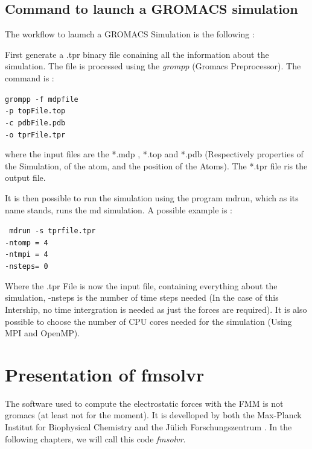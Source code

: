 \documentclass[12pt,twoside,a4paper]{report}
\begin{document}
	\subsection{Command to launch a GROMACS simulation }	
	
The workflow to laumch a GROMACS Simulation is the following : 



First generate a .tpr binary file conaining all the information about the simulation. The file is processed using the \textit{grompp} (Gromacs Preprocessor). The command is :


{\centering\tt {grompp -f mdpfile \\
	 -p topFile.top \\
	 -c pdbFile.pdb \\
	 -o tprFile.tpr \\ 
 }}

\vspace{5mm}
where the input files are the *.mdp , *.top and *.pdb (Respectively properties of the Simulation, of the atom, and the position of the Atoms). The *.tpr file ris the output file.

It is then possible to run the simulation using the program mdrun, which as its name stands, runs the md simulation. A possible example is :

{\centering\tt { mdrun -s tprfile.tpr \\
				 -ntomp = 4  			\\		
				 -ntmpi = 4				 \\
				 -nsteps= 0     		  \\  
 }}
 
\vspace{5mm}

Where the .tpr File is now the input file, containing everything about the simulation, -nsteps is the number of time steps needed (In the case of this Intership, no time intergration is needed as just the forces are required). It is also possible to choose the number of CPU cores needed for the simulation (Using MPI and OpenMP).

\section{Presentation of fmsolvr}	

	The software used to compute the electrostatic forces with the FMM is not gromacs (at least not for the moment). It is develloped by both the Max-Planck Institut for Biophysical Chemistry and the Jülich Forschungszentrum . In the following chapters, we will call this code \textit{fmsolvr}. 
	
\end{document}
